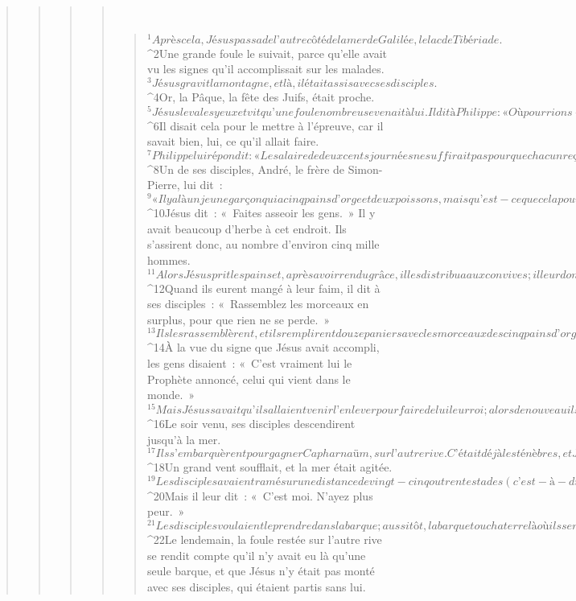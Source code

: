 \begin{verse}
\begin{verse}
\begin{verse}
\begin{verse}
         
      \bchapter{}
      \begin{verse}
${}^{1}Après cela, Jésus passa de l’autre côté de la mer de Galilée, le lac de Tibériade. 
${}^{2}Une grande foule le suivait, parce qu’elle avait vu les signes qu’il accomplissait sur les malades. 
${}^{3}Jésus gravit la montagne, et là, il était assis avec ses disciples. 
${}^{4}Or, la Pâque, la fête des Juifs, était proche.
${}^{5}Jésus leva les yeux et vit qu’une foule nombreuse venait à lui. Il dit à Philippe : « Où pourrions-nous acheter du pain pour qu’ils aient à manger ? » 
${}^{6}Il disait cela pour le mettre à l’épreuve, car il savait bien, lui, ce qu’il allait faire. 
${}^{7}Philippe lui répondit : « Le salaire de deux cents journées ne suffirait pas pour que chacun reçoive un peu de pain. » 
${}^{8}Un de ses disciples, André, le frère de Simon-Pierre, lui dit : 
${}^{9}« Il y a là un jeune garçon qui a cinq pains d’orge et deux poissons, mais qu’est-ce que cela pour tant de monde ! » 
${}^{10}Jésus dit : « Faites asseoir les gens. » Il y avait beaucoup d’herbe à cet endroit. Ils s’assirent donc, au nombre d’environ cinq mille hommes.
${}^{11}Alors Jésus prit les pains et, après avoir rendu grâce, il les distribua aux convives ; il leur donna aussi du poisson, autant qu’ils en voulaient. 
${}^{12}Quand ils eurent mangé à leur faim, il dit à ses disciples : « Rassemblez les morceaux en surplus, pour que rien ne se perde. » 
${}^{13}Ils les rassemblèrent, et ils remplirent douze paniers avec les morceaux des cinq pains d’orge, restés en surplus pour ceux qui prenaient cette nourriture. 
${}^{14}À la vue du signe que Jésus avait accompli, les gens disaient : « C’est vraiment lui le Prophète annoncé, celui qui vient dans le monde. » 
${}^{15}Mais Jésus savait qu’ils allaient venir l’enlever pour faire de lui leur roi ; alors de nouveau il se retira dans la montagne, lui seul.
${}^{16}Le soir venu, ses disciples descendirent jusqu’à la mer. 
${}^{17}Ils s’embarquèrent pour gagner Capharnaüm, sur l’autre rive. C’était déjà les ténèbres, et Jésus n’avait pas encore rejoint les disciples. 
${}^{18}Un grand vent soufflait, et la mer était agitée. 
${}^{19}Les disciples avaient ramé sur une distance de vingt-cinq ou trente stades (c’est-à-dire environ cinq mille mètres), lorsqu’ils virent Jésus qui marchait sur la mer et se rapprochait de la barque. Alors, ils furent saisis de peur. 
${}^{20}Mais il leur dit : « C’est moi. N’ayez plus peur. » 
${}^{21}Les disciples voulaient le prendre dans la barque ; aussitôt, la barque toucha terre là où ils se rendaient.
${}^{22}Le lendemain, la foule restée sur l’autre rive se rendit compte qu’il n’y avait eu là qu’une seule barque, et que Jésus n’y était pas monté avec ses disciples, qui étaient partis sans lui. 

\end{verse}
\end{verse}
\end{verse}
\end{verse}
\end{verse}
